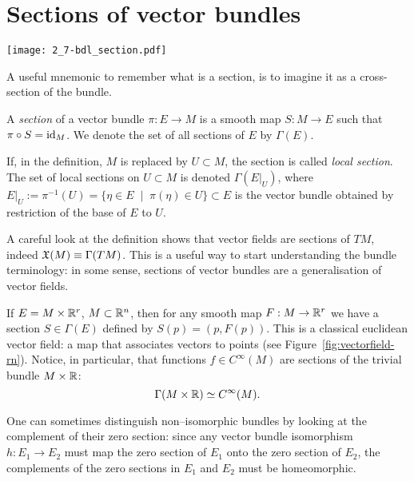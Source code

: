 \section{Sections of vector bundles}

\begin{marginfigure}
	\texttt{[image: 2\_7-bdl\_section.pdf]}
	\caption{A useful mnemonic to remember what is a section, is to imagine it as a cross-section of the bundle.}
\end{marginfigure}

\begin{definition}
	A \emph{section} of a vector bundle $\pi:E \to M$ is a smooth map $S:M \to E$ such that $\pi\circ S = \operatorname{id}_M$. We denote the set of all sections of $E$ by $\Gamma(E)$.

	If, in the definition, $M$ is replaced by $U\subset M$, the section is called \emph{local section}. The set of local sections on $U\subset M$ is denoted $\Gamma(E|_U)$, where $E|_U := \pi^{-1}(U) = \{\eta\in E\;\mid\;\pi(\eta)\in U\} \subset E$ is the vector bundle obtained by restriction of the base of $E$ to $U$.
\end{definition}

\begin{remark}
	A careful look at the definition shows that vector fields are sections of $TM$, indeed $\mathfrak{X}(M) \equiv \Gamma(TM)$.
	This is a useful way to start understanding the bundle terminology: in some sense, sections of vector bundles are a generalisation of vector fields.
\end{remark}

\begin{example}
	If $E = M\times \mathbb{R}^r$, $M\subset\mathbb{R}^n$, then for any smooth map $F: M\to\mathbb{R}^r$ we have a section $S\in\Gamma(E)$ defined by $S(p) = (p, F(p))$. This is a classical euclidean vector field: a map that associates vectors to points (see Figure~\ref{fig:vectorfield-rn}).
	Notice, in particular, that functions $f\in C^\infty(M)$ are sections of the trivial bundle $M\times\mathbb{R}$:
	\begin{equation}
		\Gamma(M\times\mathbb{R}) \simeq C^\infty(M).
	\end{equation}
\end{example}

One can sometimes distinguish non--isomorphic bundles by looking at the complement of their zero section: since any vector bundle isomorphism $h:E_1\to E_2$ must map the zero section of $E_1$ onto the zero section of $E_2$, the complements of the zero sections in $E_1$ and $E_2$ must be homeomorphic.

